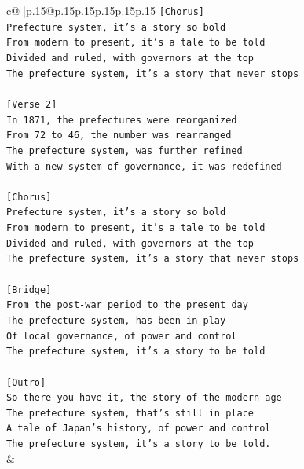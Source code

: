 \documentclass{article}
\begin{document}
{\begin{supertabular}{c@{$\;$}|p{.15\linewidth}@{}p{.15\linewidth}p{.15\linewidth}p{.15\linewidth}p{.15\linewidth}p{.15\linewidth}}
{{{\texttt{{[}Chorus{]}} \\
\texttt{Prefecture system, it's a story so bold} \\
\texttt{From modern to present, it's a tale to be told} \\
\texttt{Divided and ruled, with governors at the top} \\
\texttt{The prefecture system, it's a story that never stops} \\
\\ 
\texttt{{[}Verse 2{]}} \\
\texttt{In 1871, the prefectures were reorganized} \\
\texttt{From 72 to 46, the number was rearranged} \\
\texttt{The prefecture system, was further refined} \\
\texttt{With a new system of governance, it was redefined} \\
\\ 
\texttt{{[}Chorus{]}} \\
\texttt{Prefecture system, it's a story so bold} \\
\texttt{From modern to present, it's a tale to be told} \\
\texttt{Divided and ruled, with governors at the top} \\
\texttt{The prefecture system, it's a story that never stops} \\
\\ 
\texttt{{[}Bridge{]}} \\
\texttt{From the post{-}war period to the present day} \\
\texttt{The prefecture system, has been in play} \\
\texttt{Of local governance, of power and control} \\
\texttt{The prefecture system, it's a story to be told} \\
\\ 
\texttt{{[}Outro{]}} \\
\texttt{So there you have it, the story of the modern age} \\
\texttt{The prefecture system, that's still in place} \\
\texttt{A tale of Japan's history, of power and control} \\
\texttt{The prefecture system, it's a story to be told.} \\
            }
        }
    }
    & \\ \\


\end{supertabular}}
\end{document}
